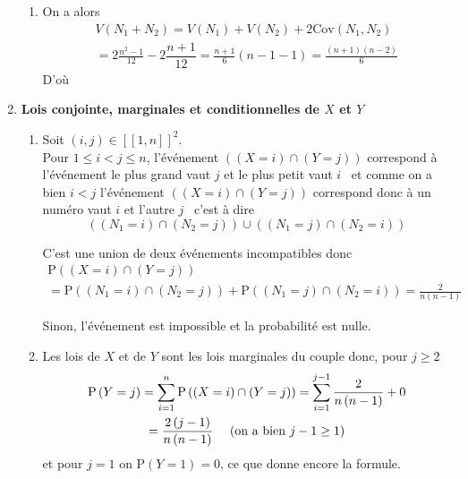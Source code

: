 \begin{enumerate}
\begin{enumerate}
\item On a alors 
\begin{multline*}
V\left( N_{1}+N_{2}\right)
 = V\left( N_{1}\right) +V\left( N_{2}\right) +2 \mathrm{Cov}\left( N_{1},N_{2}\right) \\
 = 2\frac{n^{2}-1}{12}-2\dfrac{n+1}{12} 
 = \frac{n+1}{6}\left( n-1-1\right) 
 = \frac{\left( n+1\right) \left( n-2\right) }{6}
\end{multline*}
D'où 
\end{enumerate}

\item \textbf{Lois conjointe, marginales et conditionnelles de $X$ et $Y$}

\begin{enumerate}
\item Soit $(i,j)\in[\![1,n]\!]^2$. \\
Pour $1\leqslant i<j\leqslant n$, l'événement $\left( (X=i)\cap( Y=j)\right) $ correspond à l'événement \og le plus grand vaut $j$ et le plus petit vaut $i$\fg~ et comme on a bien $i<j$ l'événement $\left( (X=i)\cap (Y=j)\right)$ correspond donc à  \og un numéro vaut $i$ et l'autre $j$\fg~ c'est à dire
\begin{displaymath}
 \left((N_{1}=i)\cap (N_{2}=j)\right) \cup \left(( N_{1}=j)\cap( N_{2}=i)\right) 
\end{displaymath}

C'est une union de deux événements incompatibles donc 
\begin{multline*}
\mathrm{P}\left(( X=i)\cap( Y=j)\right)\\ 
= \mathrm{P}\left( (N_{1}=i)\cap (N_{2}=j)\right) +\mathrm{P}\left(( N_{1}=j)\cap (N_{2}=i)\right) 
= \frac{2}{n\left( n-1\right) }
\end{multline*}

Sinon, l'\'ev\'enement est impossible et la probabilit\'e est nulle.

\item Les lois de $X$ et de $Y$ sont les lois marginales du couple donc, pour $j\geq 2$
\begin{multline*}
\mathrm{P}\left( Y=j\right) 
 = \sum_{i=1}^{n}\mathrm{P}\left(( X=i)\cap(Y=j)\right) 
 = \sum_{i=1}^{j-1}\frac{2}{n\left( n-1\right) }+0 \\
 = \frac{2\left( j-1\right) }{n\left( n-1\right) }\quad\text{ (on a bien  }j-1\geq 1)
\end{multline*}
et pour $j=1$ on $\mathrm{P}\left( Y=1\right) =0$, ce que donne encore la formule.


\end{enumerate}
\end{enumerate}
